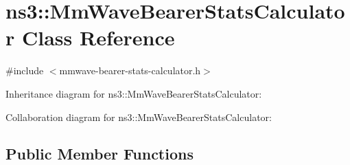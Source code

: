 \hypertarget{classns3_1_1MmWaveBearerStatsCalculator}{}\section{ns3\+:\+:Mm\+Wave\+Bearer\+Stats\+Calculator Class Reference}
\label{classns3_1_1MmWaveBearerStatsCalculator}


{\ttfamily \#include $<$mmwave-\/bearer-\/stats-\/calculator.\+h$>$}



Inheritance diagram for ns3\+:\+:Mm\+Wave\+Bearer\+Stats\+Calculator\+:


Collaboration diagram for ns3\+:\+:Mm\+Wave\+Bearer\+Stats\+Calculator\+:
\subsection*{Public Member Functions}
